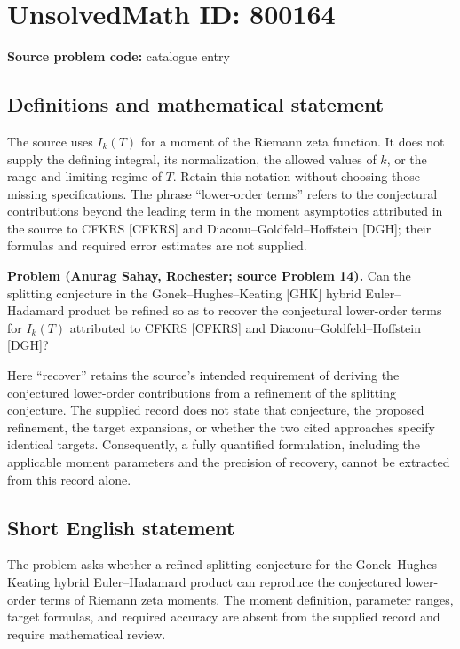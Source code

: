 \documentclass[11pt]{article}
\begin{document}
\section*{UnsolvedMath ID: 800164}
\textbf{Source problem code:} catalogue entry
\subsection{Definitions and mathematical statement}
The source uses \(I_k(T)\) for a moment of the Riemann zeta function. It does not supply the defining integral, its normalization, the allowed values of \(k\), or the range and limiting regime of \(T\). Retain this notation without choosing those missing specifications. The phrase ``lower-order terms'' refers to the conjectural contributions beyond the leading term in the moment asymptotics attributed in the source to CFKRS [CFKRS] and Diaconu--Goldfeld--Hoffstein [DGH]; their formulas and required error estimates are not supplied.

\textbf{Problem (Anurag Sahay, Rochester; source Problem 14).} Can the splitting conjecture in the Gonek--Hughes--Keating [GHK] hybrid Euler--Hadamard product be refined so as to recover the conjectural lower-order terms for \(I_k(T)\) attributed to CFKRS [CFKRS] and Diaconu--Goldfeld--Hoffstein [DGH]?

Here ``recover'' retains the source's intended requirement of deriving the conjectured lower-order contributions from a refinement of the splitting conjecture. The supplied record does not state that conjecture, the proposed refinement, the target expansions, or whether the two cited approaches specify identical targets. Consequently, a fully quantified formulation, including the applicable moment parameters and the precision of recovery, cannot be extracted from this record alone.
\subsection{Short English statement}
The problem asks whether a refined splitting conjecture for the Gonek--Hughes--Keating hybrid Euler--Hadamard product can reproduce the conjectured lower-order terms of Riemann zeta moments. The moment definition, parameter ranges, target formulas, and required accuracy are absent from the supplied record and require mathematical review.
\end{document}
